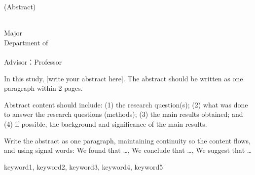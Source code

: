 
\clearpage
\thispagestyle{fancy}
\begin{flushright}
  {\fontsize{12}{20}\selectfont (Abstract)}
\end{flushright}

\begin{center}
\parbox{0.9\textwidth}{
\centering
{\fontsize{20}{26}\selectfont \thesistitlenone}
}
\end{center}
\begin{center}
{\fontsize{15}{26}\selectfont \thesistitlentwo}
\end{center}


\vspace{10mm}

\begin{flushright}
  {\fontsize{14}{18}\selectfont \authornameEN}\\
  {\fontsize{14}{18}\selectfont \majorEN{}  Major}\\
  {\fontsize{14}{18}\selectfont Department of \departmentEN}\\
  {\fontsize{14}{18}\selectfont \gradschoolEN}\\
  {\fontsize{14}{18}\selectfont Advisor：Professor \advisornameEN}
\end{flushright}

\vspace{8mm}

\begingroup
\setmainfont{Times New Roman}
\fontsize{12}{18}\selectfont   %
\setlength{\parindent}{10pt}

In this study, [write your abstract here]. The abstract should be written as one paragraph within 2 pages.

Abstract content should include: (1) the research question(s); (2) what was done to answer the research questions (methods); (3) the main results obtained; and (4) if possible, the background and significance of the main results.

Write the abstract as one paragraph, maintaining continuity so the content flows, and using signal words: We found that \ldots, We conclude that \ldots, We suggest that \ldots

\endgroup

\vspace{\baselineskip}

 {\fontsize{12}{16}\selectfont keyword1, keyword2, keyword3, keyword4, keyword5}

\newpage
